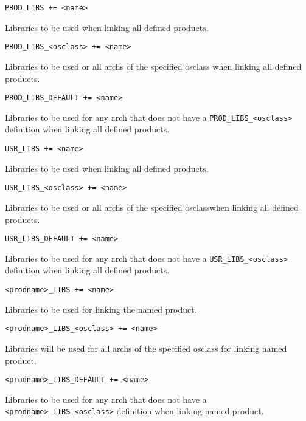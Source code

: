\begin{description}

\item {}\verb|PROD_LIBS += <name>|

Libraries to be used when linking all defined products.

\item \verb|PROD_LIBS_<osclass> += <name>|

Libraries to be used or all archs of the specified osclass when linking all defined products.

\item \verb|PROD_LIBS_DEFAULT += <name>|

Libraries to be used for any arch that does not have a \verb|PROD_LIBS_<osclass>| definition when linking all 
defined products.

\item

\item {}\verb|USR_LIBS += <name>|

Libraries to be used when linking all defined products.

\item \verb|USR_LIBS_<osclass> += <name>|

Libraries to be used or all archs of the specified osclasswhen linking all defined products.

\item \verb|USR_LIBS_DEFAULT += <name>|

Libraries to be used for any arch that does not have a \verb|USR_LIBS_<osclass>| definition when linking all 
defined products.

\item {}\verb|<prodname>_LIBS += <name>|

Libraries to be used for linking the named product.

\item \verb|<prodname>_LIBS_<osclass> += <name>|

Libraries will be used for all archs of the specified osclass for linking named product.

\item \verb|<prodname>_LIBS_DEFAULT += <name>|

Libraries to be used for any arch that does not have a \verb|<prodname>_LIBS_<osclass>| definition when linking 
named product.

\item


\end{description}
